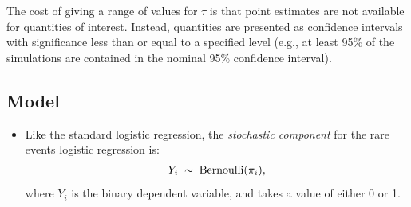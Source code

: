 \documentclass[letterpaper,10pt,english]{sphinxmanual}
\begin{document}
The cost of giving a range of values for \(\tau\) is that point
estimates are not available for quantities of interest. Instead,
quantities are presented as confidence intervals with significance less
than or equal to a specified level (e.g., at least 95\% of the
simulations are contained in the nominal 95\% confidence interval).


\subsection{Model}
\label{vignette:id53}\begin{itemize}
\item {} 
Like the standard logistic regression, the \emph{stochastic component} for
the rare events logistic regression is:
\begin{gather}
\begin{split}Y_i \; \sim \; \textrm{Bernoulli}(\pi_i),\end{split}\notag
\end{gather}
where \(Y_i\) is the binary dependent variable, and takes a value
of either 0 or 1.


\end{itemize}
\end{document}
